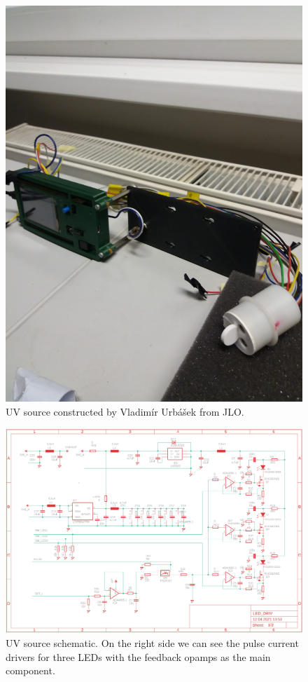  \begin{figure}[H]
 \centering
 \includegraphics[scale=0.12, angle = 0, origin = c]{./pictures/KarlsRuhe}
 \caption{UV source constructed by Vladimír Urbášek from JLO.}
 \label{UVsource}
\end{figure}

 \begin{figure}[H]
 \centering
 \includegraphics[scale=0.5, angle = 0, origin = c]{./pictures/OrigScheme.png}
 \caption{UV source schematic. On the right side we can see the pulse current drivers for three LEDs with the feedback opamps as the main component.}
 \label{UVsource}
\end{figure}


